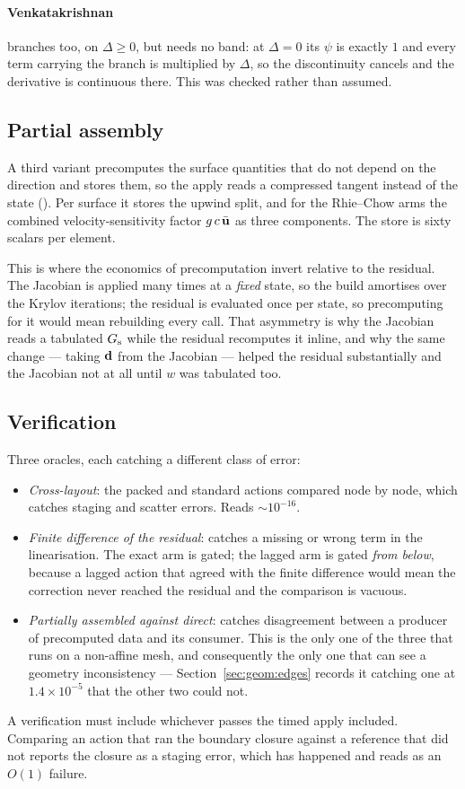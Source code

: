 \paragraph{Venkatakrishnan} branches too, on $\Delta \ge 0$, but needs no band: at $\Delta = 0$ its
$\psi$ is exactly $1$ and every term carrying the branch is multiplied by $\Delta$, so the
discontinuity cancels and the derivative is continuous there. This was checked rather than assumed.

\subsection{Partial assembly}

A third variant precomputes the surface quantities that do not depend on the direction and stores
them, so the apply reads a compressed tangent instead of the state
(). Per surface it stores the upwind split, and for the
Rhie--Chow arms the combined velocity-sensitivity factor $g\,c\,\bar{\mathbf{u}}$ as three components.
The store is sixty scalars per element.

This is where the economics of precomputation invert relative to the residual. The Jacobian is
applied many times at a \emph{fixed} state, so the build amortises over the Krylov iterations; the
residual is evaluated once per state, so precomputing for it would mean rebuilding every call.
That asymmetry is why the Jacobian reads a tabulated $G_{\mathrm{s}}$ while the residual recomputes it
inline, and why the same change --- taking $\mathbf{d}$ from the Jacobian --- helped the residual
substantially and the Jacobian not at all until $w$ was tabulated too.

\subsection{Verification}

Three oracles, each catching a different class of error:

\begin{itemize}
\item \emph{Cross-layout}: the packed and standard actions compared node by node, which catches
      staging and scatter errors. Reads $\sim10^{-16}$.
\item \emph{Finite difference of the residual}: catches a missing or wrong term in the
      linearisation. The exact arm is gated; the lagged arm is gated \emph{from below}, because a
      lagged action that agreed with the finite difference would mean the correction never reached
      the residual and the comparison is vacuous.
\item \emph{Partially assembled against direct}: catches disagreement between a producer of
      precomputed data and its consumer. This is the only one of the three that runs on a
      non-affine mesh, and consequently the only one that can see a geometry inconsistency ---
      Section~\ref{sec:geom:edges} records it catching one at $1.4\times10^{-5}$ that the other
      two could not.
\end{itemize}

A verification must include whichever passes the timed apply included. Comparing an action that
ran the boundary closure against a reference that did not reports the closure as a staging error,
which has happened and reads as an $O(1)$ failure.
